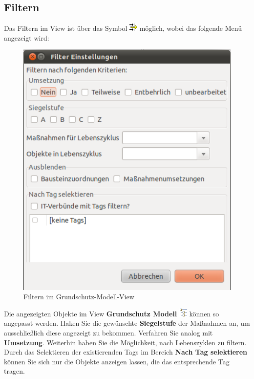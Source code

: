 \documentclass[a4paper,10pt]{book}
\begin{document}
\subsection{Filtern}
Das Filtern im View ist über das Symbol \includegraphics[height=2ex]{Icon/Filter.png} möglich, wobei das folgende Menü angezeigt wird:
\newline
\begin{figure}[htb!]
  \centering
  \includegraphics[scale=.65]{Screenshot/Filtern_gsmodell.png}
  \caption{\label{Filtern im Grundschutz-Modell-View} Filtern im Grundschutz-Modell-View}
\end{figure}
\newline
Die angezeigten Objekte im View \textbf{Grundschutz Modell} \includegraphics[height=2ex]{Icon/GS_Modell.png} können so angepasst werden.
Haken Sie die gewünschte \textbf{Siegelstufe}
der Maßnahmen an, um ausschließlich diese angezeigt zu bekommen. Verfahren Sie analog mit \textbf{Umsetzung}. Weiterhin haben Sie die Möglichkeit,
nach Lebenszyklen zu filtern. Durch das Selektieren der existierenden Tags im Bereich \textbf{Nach Tag selektieren} können Sie sich nur die
Objekte anzeigen lassen, die das entsprechende Tag tragen.
\end{document}
